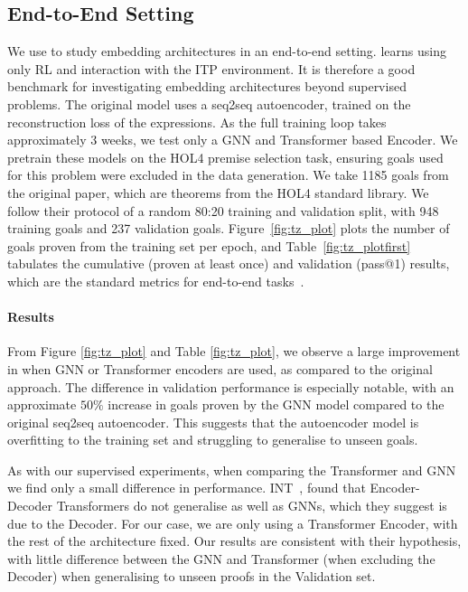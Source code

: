 \documentclass[letterpaper]{article} %
\newcommand\alg[1]{\textsc{\sffamily{#1}}}%
\newcommand\system[1]{#1}
\begin{document}
    \subsection{End-to-End Setting}

    We use \alg{TacticZero} \cite{wu_tacticzero_2021} to study embedding architectures in an end-to-end setting.
    \alg{TacticZero} learns using only RL and interaction with the ITP environment.
    It is therefore a good benchmark for investigating embedding architectures beyond supervised problems.
    The original model uses a seq2seq autoencoder, trained on the reconstruction loss of the expressions.
    As the full training loop takes approximately 3 weeks, we test only a GNN and Transformer based Encoder.
    We pretrain these models on the \system{HOL4} premise selection task, ensuring goals used for this problem were excluded in the data generation.
    We take 1185 goals from the original paper, which are theorems from the \system{HOL4} standard library. We follow their protocol of a random 80:20 training and validation split, with 948 training goals and 237 validation goals.
    Figure~\ref{fig:tz_plot} plots the
    number of goals proven from the training set per epoch, and Table~\ref{fig:tz_plotfirst} tabulates the cumulative (proven at least once) and validation (pass@1) results, which are the standard metrics for end-to-end tasks~\cite{bansal_learning_2019}.

    \paragraph{Results}
    From Figure \ref{fig:tz_plot} and Table \ref{fig:tz_plot}, we observe a large improvement in \alg{TacticZero} when GNN or Transformer encoders are used, as compared to the original approach.
    The difference in validation performance is especially notable, with an approximate $50\%$ increase in goals proven by the GNN model compared to the original seq2seq autoencoder.
    This suggests that the autoencoder model is overfitting to the training set and struggling to generalise to unseen goals.

    As with our supervised experiments, when comparing the Transformer and GNN we find only a small difference in performance.
    INT~\cite{wu_int_2020}, found that Encoder-Decoder Transformers do not generalise as well as GNNs, which they suggest is due to the Decoder.
    For our case, we are only using a Transformer Encoder, with the rest of the architecture fixed.
    Our results are consistent with their hypothesis, with little difference between the GNN and Transformer (when excluding the Decoder) when generalising to unseen proofs in the Validation set.
\end{document}
